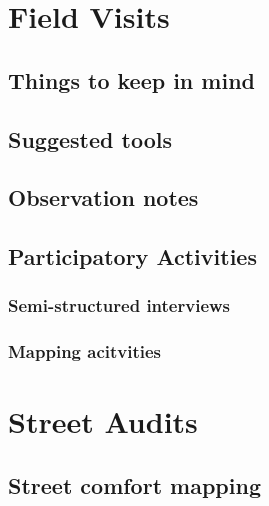 \documentclass[
]{latex/krantz}
\begin{document}
\hypertarget{field-visits}{%
\section{Field Visits}\label{field-visits}}

\hypertarget{things-to-keep-in-mind}{%
\subsection{Things to keep in mind}\label{things-to-keep-in-mind}}

\hypertarget{suggested-tools}{%
\subsection{Suggested tools}\label{suggested-tools}}

\hypertarget{observation-notes}{%
\subsection{Observation notes}\label{observation-notes}}

\hypertarget{participatory-activities}{%
\subsection{Participatory Activities}\label{participatory-activities}}

\hypertarget{semi-structured-interviews}{%
\subsubsection{Semi-structured interviews}\label{semi-structured-interviews}}

\hypertarget{mapping-acitvities}{%
\subsubsection{Mapping acitvities}\label{mapping-acitvities}}

\hypertarget{street-audits}{%
\section{Street Audits}\label{street-audits}}

\hypertarget{street-comfort-mapping}{%
\subsection{Street comfort mapping}\label{street-comfort-mapping}}
\end{document}
